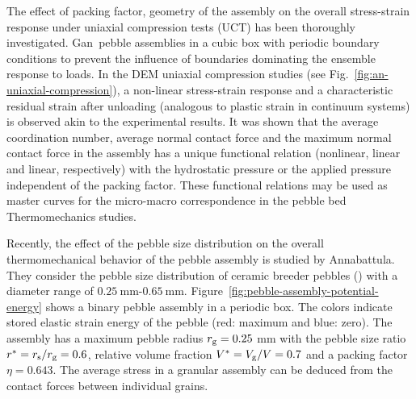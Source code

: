 The effect of packing factor, geometry of the assembly on the overall stress-strain response under uniaxial compression tests (UCT) has been thoroughly investigated.\cite{Gan:2010uq} Gan\etal~pebble assemblies in a cubic box with periodic boundary conditions to prevent the influence of boundaries dominating the ensemble response to loads.\cite{Gilabert2007} In the DEM uniaxial compression studies (see Fig.~\ref{fig:an-uniaxial-compression}), a non-linear stress-strain response and a characteristic residual strain after unloading (analogous to plastic strain in continuum systems) is observed akin to the experimental results.\cite{Reimann:2000tw} It was shown that the average coordination number, average normal contact force and the maximum normal contact force in the assembly has a unique functional relation (nonlinear, linear and linear, respectively) with the hydrostatic pressure or the applied pressure independent of the packing factor.\cite{Gan:2010uq,An20071393} These functional relations may be used as master curves for the micro-macro correspondence in the pebble bed Thermomechanics studies.

Recently, the effect of the pebble size distribution on the overall thermomechanical behavior of the pebble assembly is studied by Annabattula\etal\cite{Annabattula2011}. They consider the pebble size distribution of ceramic breeder pebbles (\lis) with a diameter range of $0.25\ \mathrm{mm}$-$0.65\ \mathrm{mm}$. Figure~\ref{fig:pebble-assembly-potential-energy} shows a binary pebble assembly in a periodic box. The colors indicate stored elastic strain energy of the pebble (red: maximum and blue: zero). The assembly has a maximum pebble radius $r_{\mathrm{g}}=0.25$ mm with the pebble size ratio $r^{*}=r_{\mathrm{s}}/r_{\mathrm{g}}=0.6$, relative volume fraction $V^{*}=V_{\mathrm{g}}/V=0.7$ and a packing factor $\eta=0.643$. The average stress in a granular assembly can be deduced from the contact forces between individual grains.


